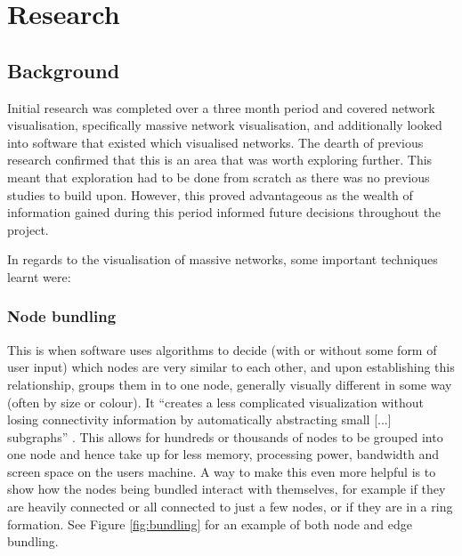 \documentclass[../dissertation.tex]{subfiles}
\begin{document}
\chapter{Research}
\label{sec:research}

\section{Background}
\label{sec:background}

Initial research was completed over a three month period and covered network visualisation, specifically massive network visualisation, and additionally looked into software that existed which visualised networks. The dearth of previous research confirmed that this is an area that was worth exploring further. This meant that exploration had to be done from scratch as there was no previous studies to build upon. However, this proved advantageous as the wealth of information gained during this period informed future decisions throughout the project.

In regards to the visualisation of massive networks, some important techniques learnt were:

\subsection{Node bundling}
\label{sec:node_bundling}
This is when software uses algorithms to decide (with or without some form of user input) which nodes are very similar to each other, and upon establishing this relationship, groups them in to one node, generally visually different in some way (often by size or colour). It ``creates a less complicated visualization without losing connectivity information by automatically abstracting small [...] subgraphs'' \cite{six2003effective}. This allows for hundreds or thousands of nodes to be grouped into one node and hence take up for less memory, processing power, bandwidth and screen space on the users machine. A way to make this even more helpful is to show how the nodes being bundled interact with themselves, for example if they are heavily connected or all connected to just a few nodes, or if they are in a ring formation. See Figure \ref{fig:bundling} for an example of both node and edge bundling.
    
\end{document}
